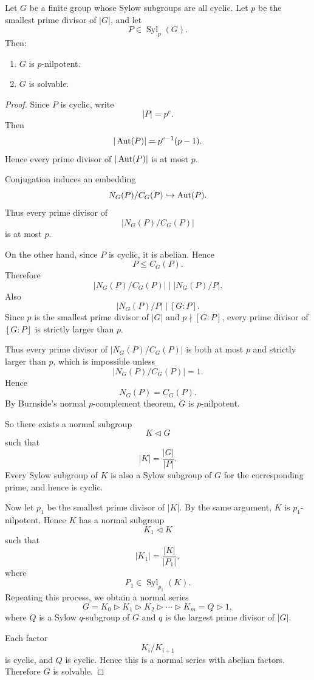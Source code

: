 \begin{theorem}[Burnside]
Let $G$ be a finite group whose Sylow subgroups are all cyclic. Let $p$ be the smallest prime divisor of $|G|$, and let
\[
    P\in \operatorname{Syl}_p(G).
\]
Then:
\begin{enumerate}[label=(\arabic*)]
    \item $G$ is $p$-nilpotent.
    \item $G$ is solvable.
\end{enumerate}
\end{theorem}

\begin{proof}
Since $P$ is cyclic, write
\[
    |P|=p^e.
\]
Then
\[
    |\operatorname{Aut}(P)|=p^{e-1}(p-1).
\]
Hence every prime divisor of $|\operatorname{Aut}(P)|$ is at most $p$.

Conjugation induces an embedding
\[
    N_G(P)/C_G(P)\hookrightarrow \operatorname{Aut}(P).
\]
Thus every prime divisor of
\[
    |N_G(P)/C_G(P)|
\]
is at most $p$.

On the other hand, since $P$ is cyclic, it is abelian. Hence
\[
    P\leq C_G(P).
\]
Therefore
\[
    |N_G(P)/C_G(P)|
    \mid
    |N_G(P)/P|.
\]
Also
\[
    |N_G(P)/P|\mid [G:P].
\]
Since $p$ is the smallest prime divisor of $|G|$ and $p\nmid [G:P]$, every prime divisor of $[G:P]$ is strictly larger than $p$.

Thus every prime divisor of $|N_G(P)/C_G(P)|$ is both at most $p$ and strictly larger than $p$, which is impossible unless
\[
    |N_G(P)/C_G(P)|=1.
\]
Hence
\[
    N_G(P)=C_G(P).
\]
By Burnside's normal $p$-complement theorem, $G$ is $p$-nilpotent.

So there exists a normal subgroup
\[
    K\lhd G
\]
such that
\[
    |K|=\frac{|G|}{|P|}.
\]
Every Sylow subgroup of $K$ is also a Sylow subgroup of $G$ for the corresponding prime, and hence is cyclic.

Now let $p_1$ be the smallest prime divisor of $|K|$. By the same argument, $K$ is $p_1$-nilpotent. Hence $K$ has a normal subgroup
\[
    K_1\lhd K
\]
such that
\[
    |K_1|=\frac{|K|}{|P_1|},
\]
where
\[
    P_1\in \operatorname{Syl}_{p_1}(K).
\]
Repeating this process, we obtain a normal series
\[
    G=K_0\triangleright K_1\triangleright K_2\triangleright\cdots\triangleright K_m=Q\triangleright 1,
\]
where $Q$ is a Sylow $q$-subgroup of $G$ and $q$ is the largest prime divisor of $|G|$.

Each factor
\[
    K_i/K_{i+1}
\]
is cyclic, and $Q$ is cyclic. Hence this is a normal series with abelian factors. Therefore $G$ is solvable.
\end{proof}

